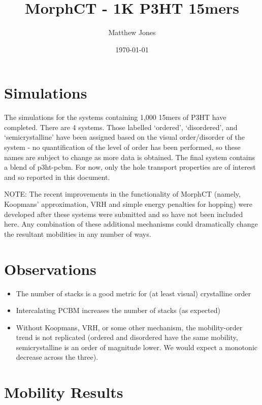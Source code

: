 \documentclass[12pt]{article}
\title{MorphCT - 1K P3HT 15mers}
\author{Matthew Jones}
\date{\today}
\begin{document}
\maketitle


\section{Simulations}


The simulations for the systems containing 1,000 15mers of P3HT have completed.
There are 4 systems.
Those labelled `ordered', `disordered', and `semicrystalline' have been assigned based on the visual order/disorder of the system - no quantification of the level of order has been performed, so these names are subject to change as more data is obtained.
The final system contains a blend of p3ht-pcbm. 
For now, only the hole transport properties are of interest and so reported in this document.


NOTE: The recent improvements in the functionality of MorphCT (namely, Koopmans' approximation, VRH and simple energy penalties for hopping) were developed after these systems were submitted and so have not been included here.
Any combination of these additional mechanisms could dramatically change the resultant mobilities in any number of ways.


\section{Observations}

\begin{itemize}
    \item{The number of stacks is a good metric for (at least visual) crystalline order}
    \item{Intercalating PCBM increases the number of stacks (as expected)}
    \item{Without Koopmans, VRH, or some other mechanism, the mobility-order trend is not replicated (ordered and disordered have the same mobility, semicrystalline is an order of magnitude lower. We would expect a monotonic decrease across the three).}
\end{itemize}

\section{Mobility Results}
\end{document}
